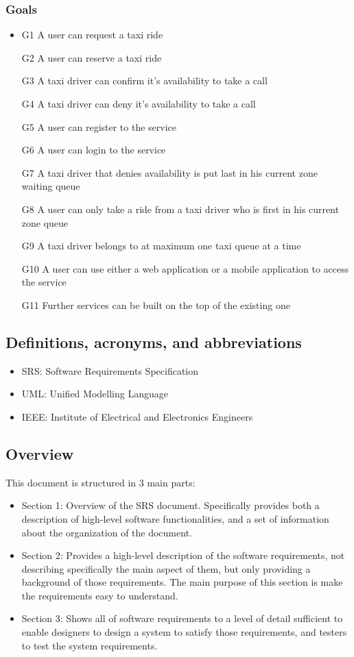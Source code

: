 \subsubsection{Goals}
\begin{itemize}
	\item G1 A user can request a taxi ride
	\item [G2] A user can reserve a taxi ride
	\item [G3] A taxi driver can confirm it's availability to take a call
	\item [G4] A taxi driver can deny it's availability to take a call
	\item [G5] A user can register to the service
	\item [G6] A user can login to the service
	\item [G7] A taxi driver that denies availability is put last in his current zone waiting queue
	\item [G8] A user can only take a ride from a taxi driver who is first in his current zone queue
	\item [G9] A taxi driver belongs to at maximum one taxi queue at a time
	\item [G10] A user can use either a web application or a mobile application to access the service
	\item [G11] Further services can be built on the top of the existing one
\end{itemize}
\subsection{Definitions, acronyms, and abbreviations}
\begin{itemize}
	\item SRS: Software Requirements Specification
	\item UML: Unified Modelling Language
	\item IEEE: Institute of Electrical and Electronics Engineers
\end{itemize}
\subsection{Overview}
This document is structured in 3 main parts:
\begin{itemize}
	\item Section 1: Overview of the SRS document. Specifically provides both a description of high-level software functionalities, and a set of information about the organization of the document.
	\item Section 2: Provides a high-level description of the software requirements, not describing specifically the main aspect of them, but only providing a background of those requirements. The main purpose of this section is make the requirements easy to understand.
	\item Section 3: Shows all of software requirements to a level of detail sufficient to enable designers to design a system to satisfy those requirements, and testers to test the system requirements.
\end{itemize}
